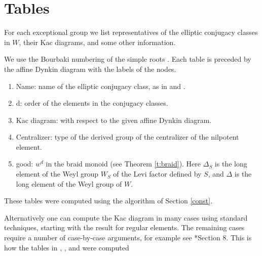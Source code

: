 \documentclass[10pt,leqno]{article}
\renewcommand{\sec}[1]{\section{#1}
\renewcommand{\theequation}{\thesection.\arabic{equation}}
  \setcounter{equation}{0}}
\renewcommand{\sec}[1]{\section{#1}
\renewcommand{\theequation}{\thesection.\arabic{equation}}
  \setcounter{equation}{0}}
\begin{document}
\sec{Tables}
\label{s:tables}

For each exceptional group we list representatives of the elliptic conjugacy classes in $W$,
their Kac diagrams, and some other information.

We use the Bourbaki numbering of the simple roots \cite{bourbaki_4-6}.
Each table is preceded by the affine Dynkin diagram with the labels of the nodes.


\begin{enumerate}
\item Name: name of the elliptic conjugacy class, as in \cite{carter_conjugacy_classes} and \cite{geck_pfeiffer}.
\item d: order of the elements in the conjugacy classes.
\item Kac diagram: with respect to the given affine Dynkin diagram.
\item Centralizer: type of the derived group of the centralizer of the nilpotent element.
\item good: $w^d$ in the braid monoid (see Theorem \ref{t:braid}). Here $\Delta_S$ is the long element of the
  Weyl group $W_S$ of the Levi factor defined by $S$, and $\Delta$ is the long element of the Weyl group of $W$.
\end{enumerate}

These tables were computed using the algorithm of Section
\ref{const}.

Alternatively one can compute the Kac diagram in many cases using
standard techniques, starting with the result for regular elements.
The remaining cases require a number of case-by-case arguments, for
example see \cite{rgly}*{Section 8}. This is how the tables in
\cite{bouwknegt}, \cite{rgly}, and \cite{levy_exceptional} were
computed
\end{document}

